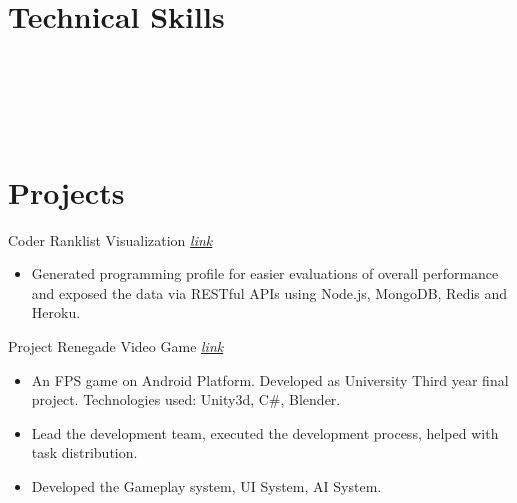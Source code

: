 \documentclass{resumestyle}
\begin{document}
\section{Technical Skills}%
\enspace%
\enspace%
\enspace%
\thinspace\thinspace%
\vspace{4pt}\\%
\enspace%
\enspace%
\enspace%
\enspace%
\vspace{4pt}\\%
\thinspace\thinspace%
\thinspace\thinspace%
\enspace%
\enspace%
\vspace{4pt}\\%
\thinspace\thinspace%
\thinspace\thinspace%
\thinspace\thinspace%
\thinspace\thinspace%
\vspace{4pt}\\%
%


\section{Projects}%
    
    \projectsubsection%
        {Coder Ranklist}%
        {Visualization \hfill \textit{\href{https://www.lus.ac.bd/cp__trashed/ranklist/}{\textcolor{link}{link}}}}%
    \begin{itemize}[labelsep=4pt,leftmargin=*,topsep=5pt,partopsep=0pt,itemsep=1pt]%
        \item Generated programming profile for easier evaluations of overall performance and exposed the data via RESTful APIs using Node.js, MongoDB, Redis and Heroku.
    \end{itemize}%

    \projectsubsection%
        {Project Renegade}%
        {Video Game \hfill
        \textit{\href{https://github.com/CLown1331/Unity-FPS/releases/tag/1.0.0/}{\textcolor{link}{link}}}}%
    \begin{itemize}[labelsep=4pt,leftmargin=*,topsep=5pt,partopsep=0pt,itemsep=1pt]%
        \item An FPS game on Android Platform. Developed as University Third year final project. Technologies used: Unity3d, C\#, Blender.
        \item Lead the development team, executed the development process, helped with task distribution.
        \item Developed the Gameplay system, UI System, AI System.
    \end{itemize}%
\end{document}
